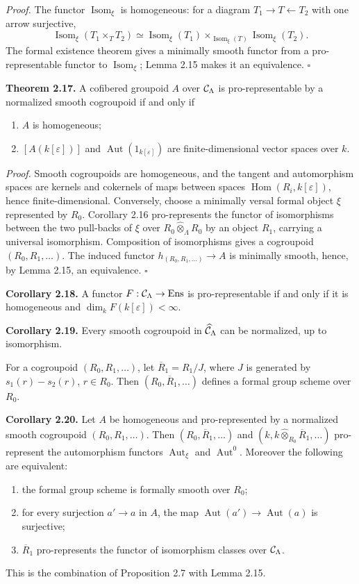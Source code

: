 \documentclass[11pt]{article}
\providecommand{\Aut}{\operatorname{Aut}}
\providecommand{\Isom}{\operatorname{Isom}}
\providecommand{\Hom}{\operatorname{Hom}}
\providecommand{\Isom}{\operatorname{Isom}}
\begin{document}
\textit{Proof.}  The functor \(\Isom_\xi\) is homogeneous: for a diagram \(T_1\to T\leftarrow T_2\) with one arrow surjective,
\[
 \Isom_\xi(T_1\times_TT_2) \simeq \Isom_\xi(T_1)\times_{\Isom_\xi(T)}\Isom_\xi(T_2).
\]
The formal existence theorem gives a minimally smooth functor from a pro-representable functor to \(\Isom_\xi\); Lemma 2.15 makes it an equivalence. \(\square\)

\textbf{Theorem 2.17.}  A cofibered groupoid \(A\) over \(\mathcal C_\Lambda\) is pro-representable by a normalized smooth cogroupoid if and only if
\begin{enumerate}[label=\textup{(\arabic*)}]
\item \(A\) is homogeneous;
\item \([A(k[\varepsilon])]\) and \(\Aut(1_{k[\varepsilon]})\) are finite-dimensional vector spaces over \(k\).
\end{enumerate}

\textit{Proof.}  Smooth cogroupoids are homogeneous, and the tangent and automorphism spaces are kernels and cokernels of maps between spaces \(\Hom(R_i,k[\varepsilon])\), hence finite-dimensional.  Conversely, choose a minimally versal formal object \(\xi\) represented by \(R_0\).  Corollary 2.16 pro-represents the functor of isomorphisms between the two pull-backs of \(\xi\) over \(R_0\widehat\otimes_\Lambda R_0\) by an object \(R_1\), carrying a universal isomorphism.  Composition of isomorphisms gives a cogroupoid \((R_0,R_1,\ldots)\).  The induced functor \(h_{(R_0,R_1,\ldots)}\to A\) is minimally smooth, hence, by Lemma 2.15, an equivalence. \(\square\)

\textbf{Corollary 2.18.}  A functor \(F:\mathcal C_\Lambda\to\mathrm{Ens}\) is pro-representable if and only if it is homogeneous and \(\dim_k F(k[\varepsilon])<\infty\).

\textbf{Corollary 2.19.}  Every smooth cogroupoid in \(\widehat{\mathcal C}_\Lambda\) can be normalized, up to isomorphism.

For a cogroupoid \((R_0,R_1,\ldots)\), let \(\overline R_1=R_1/J\), where \(J\) is generated by \(s_1(r)-s_2(r)\), \(r\in R_0\).  Then \((R_0,\overline R_1,\ldots)\) defines a formal group scheme over \(R_0\).

\textbf{Corollary 2.20.}  Let \(A\) be homogeneous and pro-represented by a normalized smooth cogroupoid \((R_0,R_1,\ldots)\).  Then \((R_0,\overline R_1,\ldots)\) and \((k,k\widehat\otimes_{R_0}\overline R_1,\ldots)\) pro-represent the automorphism functors \(\Aut_\xi\) and \(\Aut^0\).  Moreover the following are equivalent:
\begin{enumerate}[label=\textup{(\roman*)}]
\item the formal group scheme is formally smooth over \(R_0\);
\item for every surjection \(a'\to a\) in \(A\), the map \(\Aut(a')\to\Aut(a)\) is surjective;
\item \(\overline R_1\) pro-represents the functor of isomorphism classes over \(\mathcal C_\Lambda\).
\end{enumerate}
This is the combination of Proposition 2.7 with Lemma 2.15.
\end{document}
